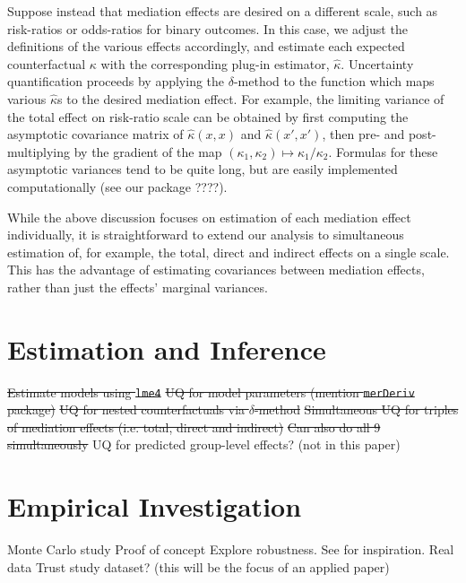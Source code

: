 \documentclass{article}
\begin{document}
Suppose instead that mediation effects are desired on a different scale, such as risk-ratios or odds-ratios for binary outcomes. In this case, we adjust the definitions of the various effects accordingly, and estimate each expected counterfactual $\kappa$ with the corresponding plug-in estimator, $\hat{\kappa}$. Uncertainty quantification proceeds by applying the $\delta$-method to the function which maps various $\hat{\kappa}$s to the desired mediation effect. For example, the limiting variance of the total effect on risk-ratio scale can be obtained by first computing the asymptotic covariance matrix of $\hat{\kappa}(x,x)$ and $\hat{\kappa}(x',x')$, then pre- and post-multiplying by the gradient of the map $(\kappa_1, \kappa_2) \mapsto \kappa_1 / \kappa_2$. Formulas for these asymptotic variances tend to be quite long, but are easily implemented computationally (see our package ????).

While the above discussion focuses on estimation of each mediation effect individually, it is straightforward to extend our analysis to simultaneous estimation of, for example, the total, direct and indirect effects on a single scale. This has the advantage of estimating covariances between mediation effects, rather than just the effects' marginal variances.



\section{Estimation and Inference}

\begin{outline}
    \1 \st{Estimate models using \texttt{lme4}}
    \1 \st{UQ for model parameters (mention \texttt{merDeriv} package)}
    \1 \st{UQ for nested counterfactuals via $\delta$-method}
    \1 \st{Simultaneous UQ for triples of mediation effects (i.e. total, direct and indirect)}
        \2 \st{Can also do all 9 simultaneously}
    \1 UQ for predicted group-level effects? (not in this paper)
\end{outline}


\section{Empirical Investigation}

\begin{outline}
    \1 Monte Carlo study
        \2 Proof of concept
        \2 Explore robustness. See \citet{Sam23} for inspiration.
    \1 Real data
        \2 Trust study dataset? (this will be the focus of an applied paper)
\end{outline}


\end{document}
